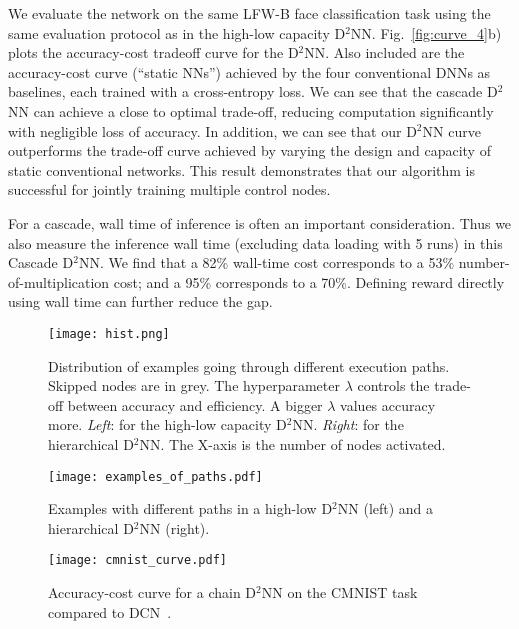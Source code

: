 \documentclass[10pt,twocolumn,letterpaper]{article}
\begin{document}
We evaluate the network on the same LFW-B face classification task using the same
evaluation protocol as in the high-low capacity
D$^2$NN. 
Fig.~\ref{fig:curve_4}b) plots the accuracy-cost tradeoff curve for the D$^2$NN.
Also included are the accuracy-cost curve (``static NNs'') achieved by the four conventional DNNs as baselines, each trained with a 
cross-entropy loss. We can see that the cascade D$^2$NN can achieve a close to optimal
trade-off, reducing computation significantly with negligible loss of accuracy. 
In addition, we can see that our D$^2$NN curve outperforms the trade-off curve achieved by varying the design and capacity of static conventional networks. 
This result demonstrates that our algorithm is successful for
jointly training multiple control nodes. 

For a cascade, wall time of inference is often an important consideration. 
Thus we also measure the inference wall time (excluding data loading with 5 runs) in this Cascade D$^2$NN. We find that a 82\% wall-time cost corresponds to a 53\% number-of-multiplication cost; and a 95\% corresponds to a 70\%. Defining reward directly using wall time can further reduce the gap. 


\begin{figure*}[t] \centering
\texttt{[image: hist.png]}
\caption{Distribution of examples going through different execution paths. Skipped nodes
are in grey. The
  hyperparameter $\lambda$ controls the trade-off between accuracy and efficiency. A bigger
  $\lambda$ values accuracy more. \emph{Left}: for the high-low
  capacity D$^2$NN. \emph{Right}: for the hierarchical D$^2$NN. The X-axis
  is the number of nodes activated.  }
  \label{fig:hist_3layer}
\end{figure*} 

\begin{figure*} \centering
\texttt{[image: examples\_of\_paths.pdf]}
   \caption{Examples with different paths in a high-low D$^2$NN (left) and a hierarchical D$^2$NN (right).}
\label{fig:vis_highlow}
\end{figure*}

\begin{figure} \centering
\texttt{[image: cmnist\_curve.pdf]}
\caption{Accuracy-cost curve for a chain D$^2$NN on the CMNIST task compared to DCN~\cite{DBLP:conf/icml/AlmahairiBCZLC16}. }
\label{fig:cmnist_curve}
\end{figure}
\end{document}
